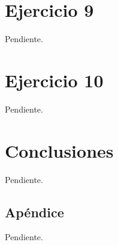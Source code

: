 \documentclass[a4paper,10pt,twoside]{article}
\begin{document}
\section{Ejercicio 9}

Pendiente.




\section{Ejercicio 10}

Pendiente.




\section{Conclusiones}

Pendiente.



\newpage

\begin{appendices}

\section{Apéndice}

Pendiente.


\end{appendices}
\end{document}
